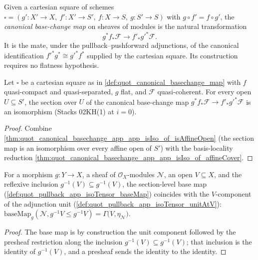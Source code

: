 \begin{definition}\leanok
  \label{def:quot_canonical_basechange_map}
  Given a cartesian square of schemes
  \(\square = (g' : X' \to X,\ f' : X' \to S',\ f : X \to S,\ g : S' \to S)\)
  with \(g \circ f' = f \circ g'\), the
  \emph{canonical base-change map} on sheaves of modules is the natural
  transformation
  \[
    g^* f_* \mathcal F \longrightarrow f'_* g'^* \mathcal F.
  \]
  It is the mate, under the pullback--pushforward adjunctions, of the canonical
  identification \(f'^*g^*\cong g'^*f^*\) supplied by the cartesian square. Its
  construction requires no flatness hypothesis.
\end{definition}

\begin{theorem}\leanok
  \label{thm:quot_canonical_basechange_app_app_isIso}
  Let \(\square\) be a cartesian square as in
  \cref{def:quot_canonical_basechange_map} with \(f\) quasi-compact and
  quasi-separated, \(g\) flat, and \(\mathcal F\) quasi-coherent. For every
  open \(U \subseteq S'\), the section over \(U\) of the canonical
  base-change map
  \(g^* f_* \mathcal F \to f'_* g'^* \mathcal F\)
  is an isomorphism (Stacks 02KH(1) at \(i = 0\)).
\end{theorem}
\begin{proof}\leanok
  Combine \cref{thm:quot_canonical_basechange_app_app_isIso_of_isAffineOpen}
  (the section map is an isomorphism over every affine open of \(S'\)) with
  the basis-locality reduction
  \cref{thm:quot_canonical_basechange_app_app_isIso_of_affineCover}.
\end{proof}

\begin{lemma}
  \label{lem:quot_baseMap_le_refl}
  \leanok
  For a morphism \(g : Y \to X\), a sheaf of \(\mathcal O_X\)-modules
  \(\mathcal N\), an open \(V \subseteq X\), and the reflexive inclusion
  \(g^{-1}(V) \subseteq g^{-1}(V)\), the section-level base map
  (\cref{def:quot_pullback_app_isoTensor_baseMap}) coincides with the
  \(V\)-component of the adjunction unit
  (\cref{def:quot_pullback_app_isoTensor_unitAtV}):
  \(\mathrm{baseMap}_g(\mathcal N, g^{-1}V \le g^{-1}V)
    = \Gamma\bigl(V, \eta_{\mathcal N}\bigr)\).
\end{lemma}
\begin{proof}\leanok
  The base map is by construction the unit component followed by the
  presheaf restriction along the inclusion \(g^{-1}(V) \subseteq g^{-1}(V)\);
  that inclusion is the identity of \(g^{-1}(V)\), and a presheaf sends the
  identity to the identity.
\end{proof}

